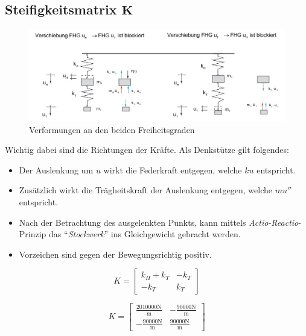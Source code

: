 \documentclass[
  letterpaper,
  DIV=11]{scrreprt}
\providecommand{\tightlist}{%
  \setlength{\itemsep}{0pt}\setlength{\parskip}{0pt}}\usepackage{longtable,booktabs,array}
\begin{document}
\hypertarget{steifigkeitsmatrix-mathbfk-1}{%
\subsection{\texorpdfstring{Steifigkeitsmatrix
\(\mathbf{K}\)}{Steifigkeitsmatrix \textbackslash mathbf\{K\}}}\label{steifigkeitsmatrix-mathbfk-1}}

\begin{figure}[H]

{\centering \includegraphics{bilder/mms3_steifigkeit.jpg}

}

\caption{\label{fig-verformungen}Verformungen an den beiden
Freiheitsgraden}

\end{figure}

Wichtig dabei sind die Richtungen der Kräfte. Als Denkstütze gilt
folgendes:

\begin{itemize}
\tightlist
\item
  Der Auslenkung um \(u\) wirkt die Federkraft entgegen, welche \(k u\)
  entspricht.
\item
  Zusätzlich wirkt die Trägheitskraft der Auslenkung entgegen, welche
  \(m u''\) entspricht.
\item
  Nach der Betrachtung des ausgelenkten Punkts, kann mittels
  \emph{Actio-Reactio}-Prinzip das ``\emph{Stockwerk}'' ins
  Gleichgewicht gebracht werden.
\item
  Vorzeichen sind gegen der Bewegungsrichtig positiv.
\end{itemize}

\begin{equation*}K = \left[\begin{matrix}k_{H} + k_{T} & - k_{T}\\- k_{T} & k_{T}\end{matrix}\right]\end{equation*}

\begin{equation*}K = \left[\begin{matrix}\frac{2010000 \text{N}}{\text{m}} & - \frac{90000 \text{N}}{\text{m}}\\- \frac{90000 \text{N}}{\text{m}} & \frac{90000 \text{N}}{\text{m}}\end{matrix}\right]\end{equation*}
\end{document}
